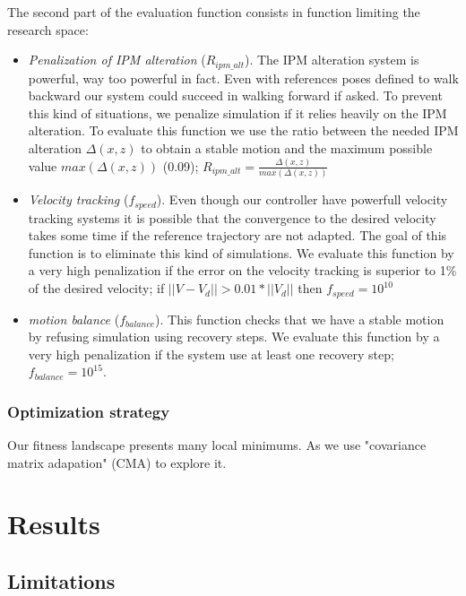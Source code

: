 \documentclass[conference]{acmsiggraph}
\begin{document}
The second part of the evaluation function consists in function limiting the research space:
\begin{itemize}
\item{\textit{Penalization of IPM alteration} ($R_{ipm\_alt}$). The IPM alteration system is powerful, way too powerful in fact. Even with references poses defined to walk backward our system could succeed in walking forward if asked. To prevent this kind of situations, we penalize simulation if it relies heavily on the IPM alteration. To evaluate this function we use the ratio between the needed IPM alteration $\Delta(x,z)$ to obtain a stable motion and the maximum possible value $max(\Delta(x,z))$ (0.09);  $R_{ipm\_alt}=\frac{\Delta(x,z)}{max(\Delta(x,z))}$}
\item{\textit{Velocity tracking} ($f_{speed}$). Even though our controller have powerfull velocity tracking systems it is possible that the convergence to the desired velocity takes some time if the reference trajectory are not adapted. The goal of this function is to eliminate this kind of simulations. We evaluate this function by a very high penalization if the error on the velocity tracking is superior to 1\% of the desired velocity; if $||V-V_d||>0.01*||V_d||$ then $f_{speed}=10^{10}$}
\item{\textit{motion balance} ($f_{balance}$). This function checks that we have a stable motion by refusing simulation using recovery steps. We evaluate this function by a very high penalization if the system use at least one recovery step; $f_{balance}=10^{15}$. }
\end{itemize}

\subsubsection{Optimization strategy}
Our fitness landscape presents many local minimums. As \cite{geijtenbeek2012simple,tan2011articulated} we use "covariance matrix adapation" (CMA) \cite{hansen2006cma} to explore it. 


\section{Results}
\label{sec:results}





\subsection{Limitations}
\label{sec:limitations}
\end{document}
